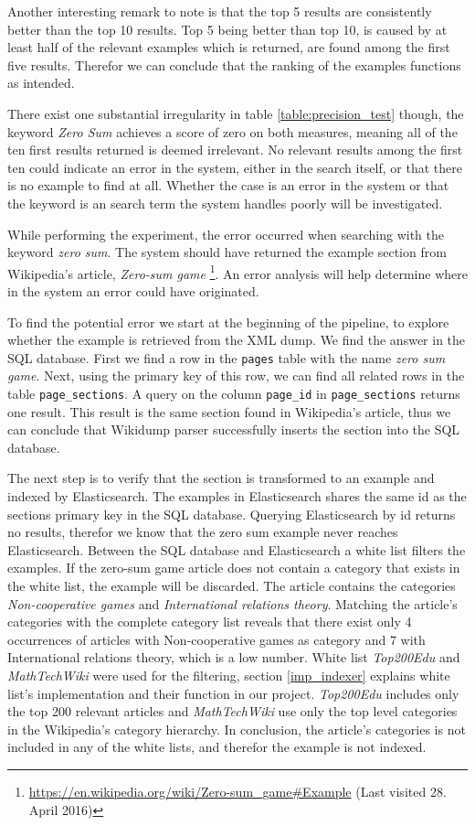 Another interesting remark to note is that the top 5 results are consistently better than the top 10 results. Top 5 being better than top 10, is caused by at least half of the relevant examples which is returned, are found among the first five results. Therefor we can conclude that the ranking of the examples functions as intended. 

There exist one substantial irregularity in table \ref{table:precision_test} though, the keyword \textit{Zero Sum} achieves a score of zero on both measures, meaning all of the ten first results returned is deemed irrelevant. No relevant results among the first ten could indicate an error in the system, either in the search itself, or that there is no example to find at all. Whether the case is an error in the system or that the keyword is an search term the system handles poorly will be investigated.

While performing the experiment, the error occurred when searching with the keyword \textit{zero sum}. The system should have returned the example section from Wikipedia's article, \textit{Zero-sum game} \footnote{\url{https://en.wikipedia.org/wiki/Zero-sum\_game\#Example} (Last visited 28. April 2016)}. An error analysis will help determine where in the system an error could have originated. 

To find the potential error we start at the beginning of the pipeline, to explore whether the example is retrieved from the XML dump. We find the answer in the SQL database. First we find a row in the \texttt{pages} table with the name \textit{zero sum game}. Next, using the primary key of this row, we can find all related rows in the table \texttt{page\_sections}. A query on the column \texttt{page\_id} in \texttt{page\_sections} returns one result. This result is the same section found in Wikipedia's article, thus we can conclude that Wikidump parser successfully inserts the section into the SQL database.

The next step is to verify that the section is transformed to an example and indexed by Elasticsearch. The examples in Elasticsearch shares the same id as the sections primary key in the SQL database. Querying Elasticsearch by id returns no results, therefor we know that the zero sum example never reaches Elasticsearch. Between the SQL database and Elasticsearch a white list filters the examples. If the zero-sum game article does not contain a category that exists in the white list, the example will be discarded. The article contains the categories \textit{Non-cooperative games} and \textit{International relations theory}. Matching the article's categories with the complete category list reveals that there exist only 4 occurrences of articles with Non-cooperative games as category and 7 with International relations theory, which is a low number. White list \textit{Top200Edu} and \textit{MathTechWiki} were used for the filtering, section \ref{imp_indexer} explains white list's implementation and their function in our project. \textit{Top200Edu} includes only the top 200 relevant articles and \textit{MathTechWiki} use only the top level categories in the Wikipedia's category hierarchy. In conclusion, the article's categories is not included in any of the white lists, and therefor the example is not indexed.


